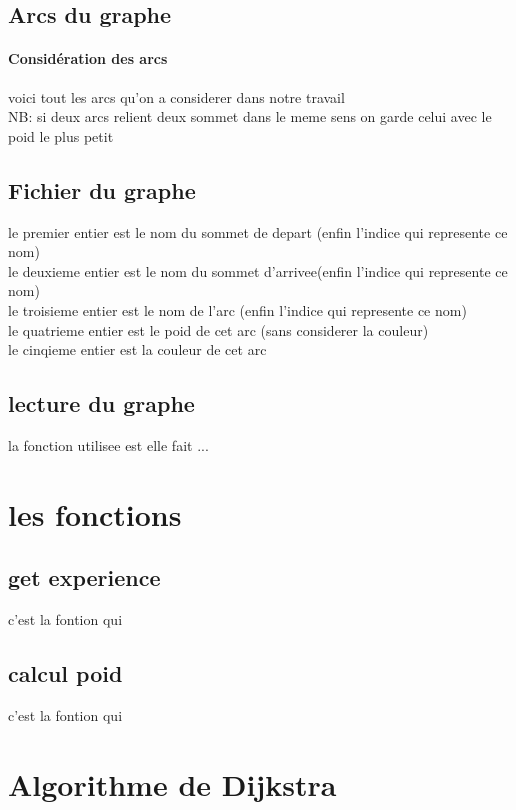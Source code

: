 \documentclass[a4]{article}
\begin{document}
		\subsection{Arcs du graphe}
			\paragraph{Considération des arcs\\}
			voici tout les arcs qu'on a considerer dans notre travail\\
			NB: si deux arcs relient deux sommet dans le meme sens on garde celui avec le poid le plus petit 
			
		\subsection{Fichier du graphe}
			le premier entier est le nom du sommet de depart (enfin l'indice qui represente ce nom)\\
			le deuxieme entier est le nom du sommet d'arrivee(enfin l'indice qui represente ce nom)\\
			le troisieme entier est le nom de l'arc (enfin l'indice qui represente ce nom)\\
			le quatrieme entier est le poid de cet arc (sans considerer la couleur)\\
			le cinqieme entier est la couleur de cet arc\\
			
		\subsection{lecture du graphe}
			la fonction utilisee est elle fait ...
			
	\section{les fonctions}
		\subsection{get experience}
			c'est la fontion qui
			
		\subsection{calcul poid}
			c'est la fontion qui
			
	\section{Algorithme de Dijkstra}
\end{document}
